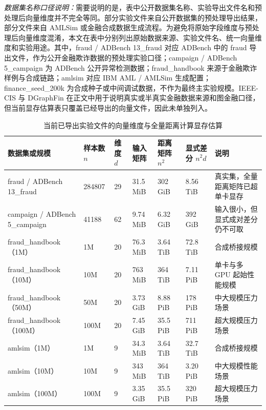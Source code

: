 \textit{数据集名称口径说明：}需要说明的是，表中公开数据集名称、实验导出文件名和预处理后向量维度并不完全等同。部分实验文件来自公开数据集的预处理导出结果，部分文件来自 AMLSim 或金融合成数据生成流程。为避免将原始字段维度与预处理后向量维度混淆，本文在表中分别列出原始数据来源、实验文件名、统一向量维度和实验用途。其中，fraud / ADBench 13\_fraud 对应 ADBench 中的 fraud 导出文件，作为公开金融欺诈数据的预处理实验口径；campaign / ADBench 5\_campaign 为 ADBench 公开异常检测数据；fraud\_handbook 来源于金融欺诈样例与合成链路；amlsim 对应 IBM AML / AMLSim 生成配置；finance\_seed\_200k 为合成种子或中间调试数据，不作为最终主实验规模。IEEE-CIS 与 DGraphFin 在正文中用于说明真实或半真实金融数据来源和图金融口径，但当前显存估算表只覆盖已经导出的向量文件，因此未单独列入。

\begin{table}[htbp]
  \caption{当前已导出实验文件的向量维度与全量距离计算显存估算}
  \label{tab:dataset-mem-estimation}
  \centering
  \footnotesize
  \setlength{\tabcolsep}{2.2pt}
  \renewcommand{\arraystretch}{1.12}
  \begin{adjustbox}{max width=\linewidth}
  \begin{tabular}{P{3.4cm}P{1.6cm}P{1.0cm}P{1.7cm}P{2.1cm}P{2.3cm}P{3.0cm}}
    \toprule
    数据集或规模 & 样本数 $n$ & 维度 $d$ & 输入矩阵 & 距离矩阵 $n^2$ & 显式差分 $n^2d$ & 说明\\
    \midrule
    fraud / ADBench 13\_fraud & 284807 & 29 & 31.5\,MiB & 302\,GiB & 8.56\,TiB & 真实集，全量距离矩阵已超单卡显存\\
    campaign / ADBench 5\_campaign & 41188 & 62 & 9.74\,MiB & 6.32\,GiB & 392\,GiB & 输入很小，但显式成对差分仍不可取\\
    fraud\_handbook（1M） & 1M & 20 & 76.3\,MiB & 3.64\,TiB & 72.8\,TiB & 合成桥接规模\\
    fraud\_handbook（10M） & 10M & 20 & 763\,MiB & 364\,TiB & 7.11\,PiB & 单卡与多 GPU 起始性能规模\\
    fraud\_handbook（50M） & 50M & 20 & 3.73\,GiB & 8.88\,PiB & 178\,PiB & 中大规模压力场景\\
    fraud\_handbook（100M） & 100M & 20 & 7.45\,GiB & 35.5\,PiB & 711\,PiB & 超大规模压力场景\\
    amlsim（1M） & 1M & 9 & 34.3\,MiB & 3.64\,TiB & 32.7\,TiB & 合成桥接规模\\
    amlsim（10M） & 10M & 9 & 343\,MiB & 364\,TiB & 3.20\,PiB & 中大规模性能场景\\
    amlsim（100M） & 100M & 9 & 3.35\,GiB & 35.5\,PiB & 320\,PiB & 超大规模压力场景\\

\end{tabular}
\end{adjustbox}
\end{table}
